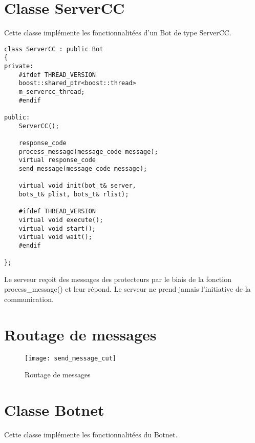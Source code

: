 \documentclass[11pt]{article}
\begin{document}
\newpage
\section{Classe ServerCC}
Cette classe implémente les fonctionnalitées d'un Bot de type ServerCC.\\

\begin{minipage}[c]{.46\linewidth}
\begin{verbatim} 
class ServerCC : public Bot
{
private:
	#ifdef THREAD_VERSION
	boost::shared_ptr<boost::thread> 
	m_servercc_thread;
	#endif	 

public:
	ServerCC();
	
	response_code 
	process_message(message_code message);
	virtual response_code 
	send_message(message_code message);
	
	virtual void init(bot_t& server, 
	bots_t& plist, bots_t& rlist);

	#ifdef THREAD_VERSION
	virtual void execute();
	virtual void start();
	virtual void wait();
	#endif

};
\end{verbatim}	
\end{minipage} \hfill
\begin{minipage}[c]{.46\linewidth}
Le serveur reçoit des messages des protecteurs par le biais de la fonction process\_message() et leur répond. Le serveur ne prend jamais l'initiative de la communication.
\end{minipage}
\newpage

\section{Routage de messages}
\begin{figure}[h!]
  \centering
    \texttt{[image: send\_message\_cut]}
  \caption{Routage de messages}
\end{figure}

\newpage


\section{Classe Botnet}
Cette classe implémente les fonctionnalitées du Botnet.\\
\end{document}
